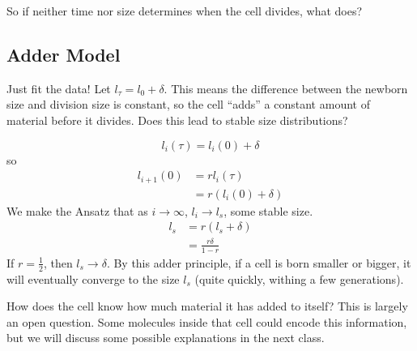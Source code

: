 \documentclass[a4paper,twoside,master.tex]{subfiles}
\begin{document}
So if neither time nor size determines when the cell divides, what does?

\subsection{Adder Model}\label{sub:adder_model}

Just fit the data! Let $ l_{\tau} = l_0 + \delta $. This means the difference between the newborn size and division size is constant, so the cell ``adds'' a constant amount of material before it divides. Does this lead to stable size distributions?

\begin{equation}
    l_i(\tau) = l_i(0) + \delta
\end{equation}
so
\begin{align}
    l_{i+1}(0) &= r l_i(\tau) \\
               &= r(l_i(0) + \delta)
\end{align}
We make the Ansatz that as $ i \to \infty $, $ l_i \to l_s $, some stable size.
\begin{align}
    l_s &= r(l_s + \delta) \\
        &= \frac{r \delta}{1 - r}
\end{align}
If $ r = \frac{1}{2} $, then $ l_s \to \delta $. By this adder principle, if a cell is born smaller or bigger, it will eventually converge to the size $ l_s $ (quite quickly, withing a few generations).

How does the cell know how much material it has added to itself? This is largely an open question. Some molecules inside that cell could encode this information, but we will discuss some possible explanations in the next class.
\end{document}
